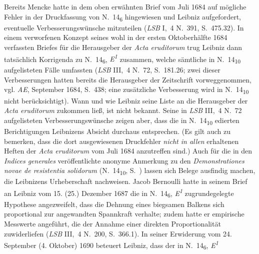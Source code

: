 Bereits Mencke\protect{} hatte in dem oben erwähnten Brief vom Juli 1684 auf mögliche Fehler in der Druckfassung von N.~14\textsubscript{6} %
hingewiesen und Leibniz aufgefordert, eventuelle Verbesserungswünsche mitzuteilen (\textit{LSB} I,~4 N.~391, S.~475.32).\cite{01258}
In einem verworfenen Konzept seines wohl in der ersten Oktoberhälfte 1684 verfassten Briefes für die Herausgeber der \textit{Acta eruditorum} trug Leibniz dann tatsächlich Korrigenda zu N.~14\textsubscript{6}, \textit{E\textsuperscript{1}} %
zusammen, welche sämtliche in N.~14\textsubscript{10} aufgelisteten Fälle umfassten (\cite{01257}\textit{LSB} III,~4 N.~72, S.~181.26; zwei dieser Verbesserungen hatten bereits die Herausgeber der Zeitschrift vorweggenommen, vgl. \textit{AE}, September 1684, S.~438; eine zusätzliche Verbesserung wird in N.~14\textsubscript{10} nicht berücksichtigt).
Wann und wie Leibniz seine Liste an die Herausgeber der \textit{Acta eruditorum} zukommen ließ, ist nicht bekannt.
Seine in \cite{01257}\textit{LSB} III,~4 N.~72 aufgelisteten Verbesserungswünsche zeigen aber, dass die in N.~14\textsubscript{10} edierten Berichtigungen Leibnizens Absicht durchaus entsprechen.
(Es gilt auch zu bemerken, dass die dort ausgewiesenen Druckfehler \textit{nicht in allen} erhaltenen Heften der \textit{Acta eruditorum} vom Juli 1684 anzutreffen sind.)
\pend%
\pstart%
Auch für die in den \textit{Indices generales} veröffentlichte anonyme Anmerkung zu den \textit{Demonstrationes novae de resistentia solidorum}
(N.~14\textsubscript{10}, S.~) lassen sich Belege ausfindig machen, die Leibnizens Urheberschaft nachweisen.
Jacob Bernoulli\protect{} hatte in seinem Brief an Leibniz vom 15. (25.) Dezember 1687 die in N.~14\textsubscript{6}, \textit{E\textsuperscript{1}} %
zugrundegelegte Hypothese angezweifelt, dass die Dehnung eines biegsamen Balkens sich proportional zur angewandten Spannkraft verhalte;
zudem hatte er empirische Messwerte angeführt, die der Annahme einer direkten Proportionalität zuwiderliefen (\cite{01259}\textit{LSB} III,~4 N.~200, S.~366.1). 
In seiner Erwiderung vom 24. September (4. Oktober) 1690 beteuert Leibniz, dass der in N.~14\textsubscript{6}, \textit{E\textsuperscript{1}} %
